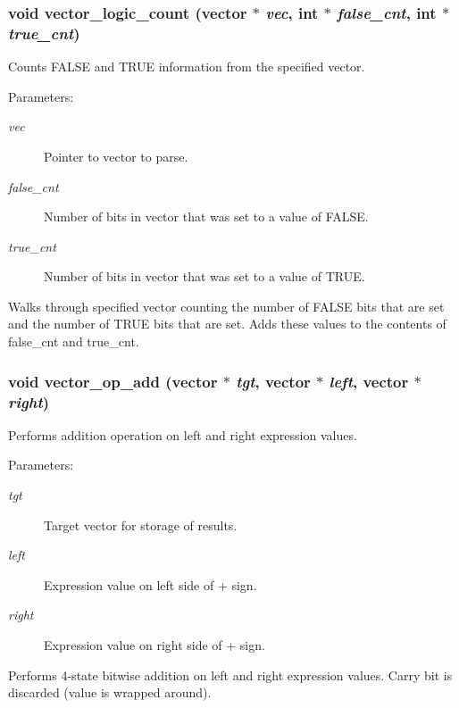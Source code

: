 \subsubsection{\setlength{\rightskip}{0pt plus 5cm}void vector\_\-logic\_\-count ({\bf vector} $\ast$ {\em vec}, int $\ast$ {\em false\_\-cnt}, int $\ast$ {\em true\_\-cnt})}\label{vector_8h_a21}


Counts FALSE and TRUE information from the specified vector.

\begin{Desc}
\item[Parameters: ]\par
\begin{description}
\item[{\em 
vec}]Pointer to vector to parse. \item[{\em 
false\_\-cnt}]Number of bits in vector that was set to a value of FALSE. \item[{\em 
true\_\-cnt}]Number of bits in vector that was set to a value of TRUE.\end{description}
\end{Desc}
Walks through specified vector counting the number of FALSE bits that are set and the number of TRUE bits that are set. Adds these values to the contents of false\_\-cnt and true\_\-cnt. 
\subsubsection{\setlength{\rightskip}{0pt plus 5cm}void vector\_\-op\_\-add ({\bf vector} $\ast$ {\em tgt}, {\bf vector} $\ast$ {\em left}, {\bf vector} $\ast$ {\em right})}\label{vector_8h_a26}


Performs addition operation on left and right expression values.

\begin{Desc}
\item[Parameters: ]\par
\begin{description}
\item[{\em 
tgt}]Target vector for storage of results. \item[{\em 
left}]Expression value on left side of + sign. \item[{\em 
right}]Expression value on right side of + sign.\end{description}
\end{Desc}
Performs 4-state bitwise addition on left and right expression values. Carry bit is discarded (value is wrapped around). 

